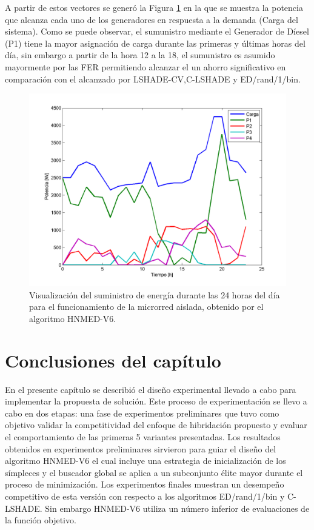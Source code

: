 A partir de estos vectores se generó la Figura \ref{Visualización del suministro de energía durante las 24 horas del día para el funcionamiento de la microrred aislada, obtenido por el algoritmo HNMED-V6.} en la que se muestra la potencia que alcanza cada uno de los generadores en respuesta a la demanda (Carga del sistema). Como se puede observar, el sumunistro mediante el Generador de Díesel (P1) tiene la mayor asignación de carga durante las primeras  y últimas horas del día, sin embargo a partir de la hora 12 a la 18, el sumunistro es asumido mayormente por las FER permitiendo alcanzar el un ahorro significativo en comparación con el alcanzado por LSHADE-CV,C-LSHADE y ED/rand/1/bin.

\begin{figure}[h]
	\centering
		\includegraphics[width=\textwidth]{Figures/SCE1}


	\caption{Visualización del suministro de energía durante las 24 horas del día para el funcionamiento de la microrred aislada, obtenido por el algoritmo HNMED-V6.} \label{Visualización del suministro de energía durante las 24 horas del día para el funcionamiento de la microrred aislada, obtenido por el algoritmo HNMED-V6.}
\end{figure}
\newpage

\section{Conclusiones del capítulo}
En el presente capítulo se describió el diseño experimental llevado a cabo para implementar la propuesta de solución. Este proceso de experimentación se llevo a cabo en dos etapas: una fase de experimentos preliminares que tuvo como objetivo validar la competitividad del enfoque de hibridación propuesto y evaluar el comportamiento de las primeras 5 variantes presentadas. Los resultados obtenidos en experimentos preliminares sirvieron para guiar el diseño del algoritmo HNMED-V6 el cual incluye una estrategia de inicialización de los símpleces y el buscador global se aplica a un subconjunto élite mayor durante el proceso de minimización. Los experimentos finales muestran un desempeño competitivo de esta versión con respecto a los algoritmos ED/rand/1/bin y C-LSHADE. Sin embargo HNMED-V6 utiliza un número inferior de evaluaciones de la función objetivo.